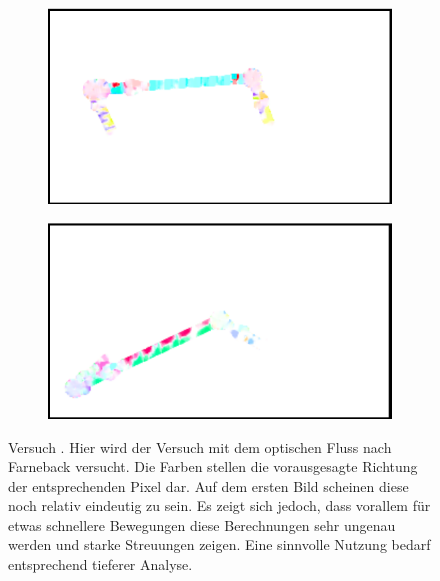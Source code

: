 \begin{figure}
    \centering
    \begin{subfigure}[t]{0.45\textwidth}
        \includegraphics[width=\textwidth]{gfx/farneback_okay.png}
        \label{fig:opticalflow1_okay}
    \end{subfigure}
    \begin{subfigure}[t]{0.45\textwidth}
        \includegraphics[width=\textwidth]{gfx/farneback_bad.png}
        \label{fig:opticalflow1_1_bad}
    \end{subfigure}
    \caption[Versuch ]{Versuch . Hier wird der Versuch mit dem optischen Fluss nach Farneback versucht. Die Farben stellen die vorausgesagte Richtung der entsprechenden Pixel dar. Auf dem ersten Bild scheinen diese noch relativ eindeutig zu sein. Es zeigt sich jedoch, dass vorallem für etwas schnellere Bewegungen diese Berechnungen sehr ungenau werden und starke Streuungen zeigen. Eine sinnvolle Nutzung bedarf entsprechend tieferer Analyse.}
    \label{fig:gruppe_2_1}
\end{figure}

